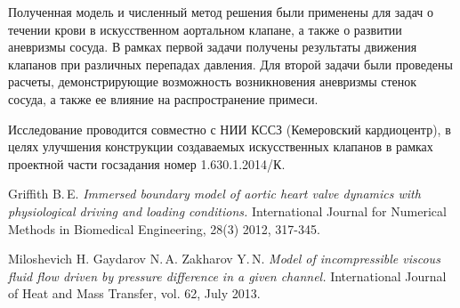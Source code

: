 \documentclass[12pt,a4paper,twoside]{article}
\begin{document}
Полученная модель и численный метод решения были применены для задач о течении крови в искусственном аортальном клапане, а также о развитии аневризмы сосуда. В рамках первой задачи получены результаты движения клапанов при различных перепадах давления. Для второй задачи были проведены расчеты, демонстрирующие возможность возникновения аневризмы стенок сосуда, а также ее влияние на распространение примеси.

Исследование проводится совместно с НИИ КССЗ (Кемеровский кардиоцентр), в целях улучшения конструкции создаваемых искусственных клапанов в рамках проектной части госзадания номер 1.630.1.2014/К.

\begin{thebibliography}{9}
     Griffith B.\,E. {\em Immersed boundary model of aortic heart valve dynamics with physiological driving and loading conditions.} International Journal for Numerical Methods in Biomedical Engineering, 28(3) 2012, 317-345.

	 Miloshevich H. Gaydarov N.\,A. Zakharov Y.\,N. {\em Model of incompressible viscous fluid flow driven by  pressure difference in a given channel.} International Journal of Heat and Mass Transfer, vol. 62, July 2013.

\end{thebibliography}
\end{document}
